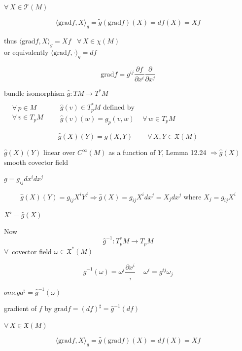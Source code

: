 \documentclass[11pt]{amsart}
\theoremstyle{definition}
\begin{document}
$\forall \, X \in \mathcal{T}(M)$

\[
\langle \text{grad}{f}, X\rangle_g = \widetilde{g} (\text{grad}{f})(X) = df(X) = Xf
\]

thus $\langle \text{grad}{f}, X\rangle_g = Xf$ \quad \, $\forall \, X \in \mathcal{\chi}(M)$ \\
\phantom{thus } or equivalently $\langle \text{grad}{f}, \cdot \rangle_g = df$

\[
\text{grad}{f} = g^{ij} \frac{ \partial f}{ \partial x^i} \frac{ \partial }{ \partial x^j}
\]
\hrulefill


bundle isomorphism $\widehat{g} : TM \to T^*M$  \\

$\begin{aligned}
  & \quad \\
  & \forall \, p \in M \\
  & \forall \, v \in T_pM \end{aligned}$ \quad \quad \, $\begin{aligned} & \quad \\
  & \widehat{g}(v) \in T_p^*M \text{ defined by } \\
  & \widehat{g}(v)(w) = g_p(v,w) \quad \, \forall \, w \in T_p M \end{aligned}$

\[
\widehat{g}(X)(Y) = g(X,Y) \quad \quad \, \forall \, X,Y \in \mathfrak{X}(M)
\]


$\widehat{g}(X)(Y)$ linear over $C^{\infty}(M)$ as a function of $Y$, Lemma 12.24 $\Longrightarrow \widehat{g}(X)$ smooth covector field

$g=g_{ij}dx^i dx^j$

\[
\widehat{g}(X)(Y) = g_{ij}X^i Y^j \Longrightarrow \widehat{g}(X) = g_{ij}X^i dx^j = X_j dx^j \text{ where } X_j = g_{ij}X^i
\]

$X^{\flat} = \widehat{g}(X)$


Now
\[
\widehat{g}^{-1}:T_p^*M \to T_pM
\]
$\forall \, $ covector field $\omega \in \mathfrak{X}^*(M)$

\[
\widehat{g}^{-1}(\omega) = \omega^i \frac{ \partial x^i}, \quad \, \omega^i = g^{ij}\omega_j
\]

$omega^{\sharp} = \widehat{g}^{-1}(\omega)$


gradient of $f$ by $\text{grad}{f} = (df)^{\sharp} = \widehat{g}^{-1}(df)$

$\forall \, X \in \mathfrak{X}(M)$

\[
\langle \text{grad}f, X\rangle_g = \widehat{g}(\text{grad}f)(X) = df(X) =Xf
\]
\end{document}
